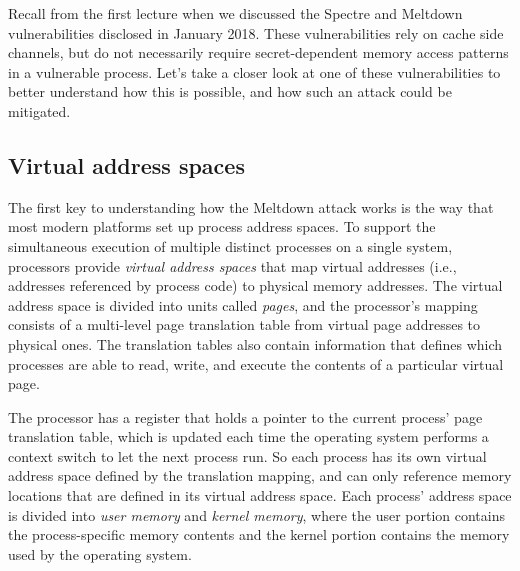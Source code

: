 \documentclass[11pt,twoside]{scrartcl}
\begin{document}
Recall from the first lecture when we discussed the Spectre and Meltdown vulnerabilities disclosed in January 2018. These vulnerabilities rely on cache side channels, but do not necessarily require secret-dependent memory access patterns in a vulnerable process. Let's take a closer look at one of these vulnerabilities to better understand how this is possible, and how such an attack could be mitigated.

\subsection{Virtual address spaces}

The first key to understanding how the Meltdown attack works is the way that most modern platforms set up process address spaces. To support the simultaneous execution of multiple distinct processes on a single system, processors provide \emph{virtual address spaces} that map virtual addresses (i.e., addresses referenced by process code) to physical memory addresses. The virtual address space is divided into units called \emph{pages}, and the processor's mapping consists of a multi-level page translation table from virtual page addresses to physical ones. The translation tables also contain information that defines which processes are able to read, write, and execute the contents of a particular virtual page.

The processor has a register that holds a pointer to the current process' page translation table, which is updated each time the operating system performs a context switch to let the next process run. So each process has its own virtual address space defined by the translation mapping, and can only reference memory locations that are defined in its virtual address space. Each process' address space is divided into \emph{user memory} and \emph{kernel memory}, where the user portion contains the process-specific memory contents and the kernel portion contains the memory used by the operating system. 


\end{document}
